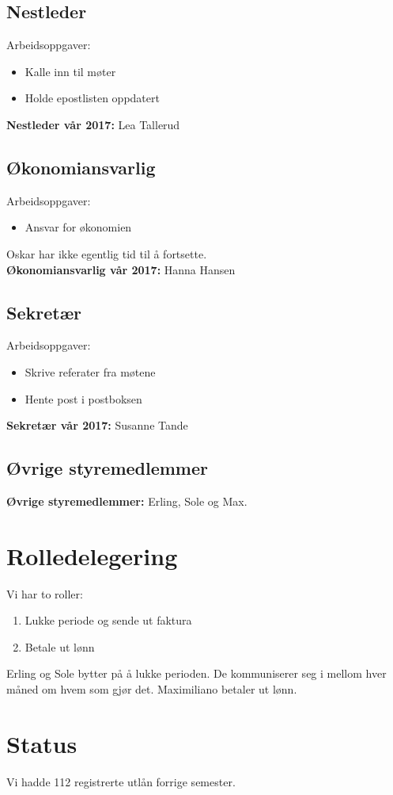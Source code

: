 \documentclass[a4paper,norsk]{article}
\begin{document}
\subsection*{Nestleder}
Arbeidsoppgaver:
\begin{itemize}
	\item Kalle inn til møter
	\item Holde epostlisten oppdatert
\end{itemize}
\textbf{Nestleder vår 2017:} Lea Tallerud

\subsection*{Økonomiansvarlig}
Arbeidsoppgaver:
\begin{itemize}
	\item Ansvar for økonomien
\end{itemize}
Oskar har ikke egentlig tid til å fortsette.\\
\textbf{Økonomiansvarlig vår 2017:} Hanna Hansen

\subsection*{Sekretær}
Arbeidsoppgaver:
\begin{itemize}
	\item Skrive referater fra møtene
	\item Hente post i postboksen
\end{itemize}
\textbf{Sekretær vår 2017:} Susanne Tande
\subsection*{Øvrige styremedlemmer}
\textbf{Øvrige styremedlemmer:} Erling, Sole og Max.

\section{Rolledelegering}
Vi har to roller:
\begin{enumerate}
	\item Lukke periode og sende ut faktura
	\item Betale ut lønn
\end{enumerate}
Erling og Sole bytter på å lukke perioden. De kommuniserer seg i mellom hver måned om hvem som gjør det. Maximiliano betaler ut lønn.

\section{Status}
Vi hadde 112 registrerte utlån forrige semester.
\end{document}
